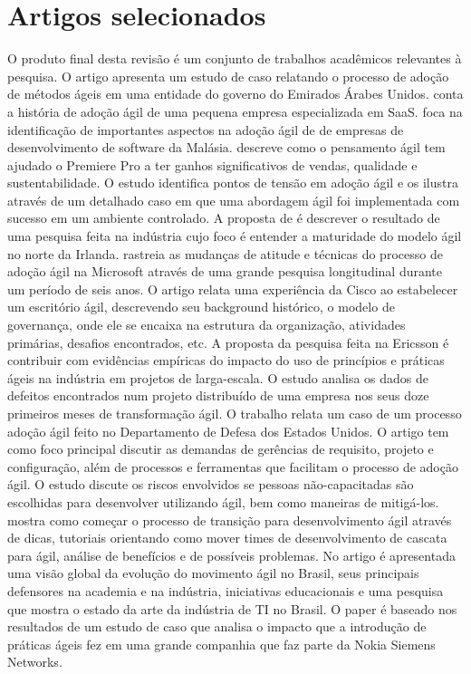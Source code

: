 	\section{Artigos selecionados}
		O produto final desta revisão é um conjunto de trabalhos acadêmicos relevantes à pesquisa. O artigo \cite{Hajjdiab2011} apresenta um estudo de caso relatando o processo de adoção de métodos ágeis em uma entidade do governo do Emirados Árabes Unidos. \cite{Block2011} conta a história de adoção ágil de uma pequena empresa especializada em SaaS. \cite{Asnawi2012} foca na identificação de importantes aspectos na adoção ágil de de empresas de desenvolvimento de software da Malásia. \cite{Adobe2012} descreve como o pensamento ágil tem ajudado o Premiere Pro a ter ganhos significativos de vendas, qualidade e sustentabilidade. O estudo \cite{Fitzgerald2013} identifica pontos de tensão em adoção ágil e os ilustra através de um detalhado caso em que uma abordagem ágil foi implementada com sucesso em um ambiente controlado. A proposta de \cite{Bustard2013} é descrever o resultado de uma pesquisa feita na indústria cujo foco é entender a maturidade do modelo ágil no norte da Irlanda. \cite{Microsoft2013} rastreia as mudanças de atitude e técnicas do processo de adoção ágil na Microsoft através de uma grande pesquisa longitudinal durante um período de seis anos. O artigo \cite{Cisco2011} relata uma experiência da Cisco ao estabelecer um escritório ágil, descrevendo seu background histórico, o modelo de governança, onde ele se encaixa na estrutura da organização, atividades primárias, desafios encontrados, etc. A proposta da pesquisa \cite{Ericsson2013} feita na Ericsson é contribuir com evidências empíricas do impacto do uso de princípios e práticas ágeis na indústria em projetos de larga-escala. O estudo \cite{Korhonen2010} analisa os dados de defeitos encontrados num projeto distribuído de uma empresa nos seus doze primeiros meses de transformação ágil. O trabalho \cite{Lapham2012} relata um caso de um processo adoção ágil feito no Departamento de Defesa dos Estados Unidos. O artigo \cite{Arikpo2011} tem como foco principal discutir as demandas de gerências de requisito, projeto e configuração, além de processos e ferramentas que facilitam o processo de adoção ágil. O estudo \cite{Radha2012} discute os riscos envolvidos se pessoas não-capacitadas são escolhidas para desenvolver utilizando ágil, bem como maneiras de mitigá-los. \cite{Eunha2012} mostra como começar o processo de transição para desenvolvimento ágil através de dicas, tutoriais orientando como mover times de desenvolvimento de cascata para ágil, análise de benefícios e de possíveis problemas. No artigo \cite{Claudia2013} é apresentada uma visão global da evolução do movimento ágil no Brasil, seus principais defensores na academia e na indústria, iniciativas educacionais e uma pesquisa que mostra o estado da arte da indústria de TI no Brasil. O paper \cite{Nokia2013} é baseado nos resultados de um estudo de caso que analisa o impacto que a introdução de práticas ágeis fez em uma grande companhia que faz parte da Nokia Siemens Networks. 
